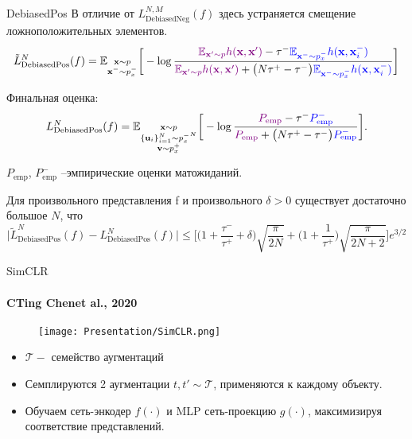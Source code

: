 \documentclass{beamer}
\begin{document}
\begin{frame}{DebiasedPos}
\scriptsize
В отличие от $L_{\text{DebiasedNeg}}^{N, M}(f)$ здесь устраняется смещение ложноположительных элементов.
\begin{equation*}
\tilde{L}_{\text{DebiasedPos}}^N (f) = \mathbb{E}_{\substack{\textbf{x} \sim p \\ \textbf{x}^- \sim p_x^-}} \bigg[ - \log \frac{\color{violet} \mathbb{E}_{\textbf{x}' \sim p} h(\textbf{x}, \textbf{x}') \color{black} - \tau^- \color{blue} \mathbb{E}_{\textbf{x}^- \sim p_x^-} h(\textbf{x}, \textbf{x}_i^-)}{\color{violet} \mathbb{E}_{\textbf{x}' \sim p} h(\textbf{x}, \textbf{x}') \color{black} + \big(N \tau^+ - \tau^-\big) \color{blue} \mathbb{E}_{\textbf{x}^- \sim p_x^-} h(\textbf{x}, \textbf{x}_i^-)}\bigg]
\end{equation*}

Финальная оценка:
\begin{equation*}
L_{\text{DebiasedPos}}^N (f) = \mathbb{E}_{\substack{\textbf{x} \sim p \\ \{\textbf{u}_i\}_{i=1}^N \sim {p_x^-}^N \\ \textbf{v} \sim p_x^+}} \bigg[-\log \frac{\color{violet}P_{\text{emp}} \color{black} - \tau^- \color{blue} P_{\text{emp}}^-} {\color{violet}P_{\text{emp}} \color{black} + \big(N \tau^+ - \tau^-\big) \color{blue} P_{\text{emp}}^- }\bigg].
\end{equation*}

$P_{\text{emp}}$, $P_{\text{emp}}^-$ --эмпирические оценки матожиданий.

\begin{theorem}
Для произвольного представления f и произвольного $\delta > 0$ существует достаточно большое $N$, что
\begin{equation*}
\big|\tilde{L}_{\text{DebiasedPos}}^N (f) - L_{\text{DebiasedPos}}^N (f)\big| \leq \bigg[\bigg(1 + \frac{\tau^-}{\tau^+} + \delta\bigg) \sqrt{\frac{\pi}{2N}} + \bigg(1 + \frac{1}{\tau^+}\bigg) \sqrt{\frac{\pi}{2N + 2}}\bigg] e^{3/2}
\end{equation*}
\end{theorem}
\end{frame}
\begin{frame}{SimCLR}
\framesubtitle{CTing Chenet al., 2020} %

\begin{figure}
    \texttt{[image: Presentation/SimCLR.png]}
\end{figure}

\scriptsize
\begin{itemize}
    \item $\mathcal{T} -$ семейство аугментаций
    \item Семплируются 2 аугментации $t, t' \sim \mathcal{T}$, применяются к каждому объекту.
    \item Обучаем сеть-энкодер $f(\cdot)$ и MLP сеть-проекцию $g(\cdot)$, максимизируя соответствие представлений.
\end{itemize}
\end{frame}
\end{document}
